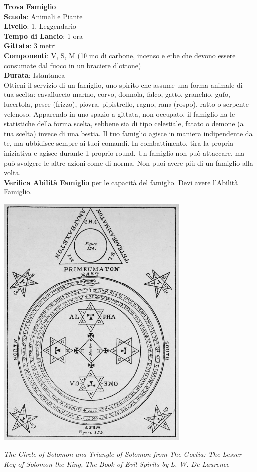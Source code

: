 \begin{multicols}{2}
\medskip\textbf{Trova Famiglio}\\
\textbf{Scuola}: Animali e Piante\\
\textbf{Livello}: 1, Leggendario\\
\textbf{Tempo di Lancio}: 1 ora\\
\textbf{Gittata}: 3 metri\\
\textbf{Componenti}: V, S, M (10 mo di carbone, incenso e erbe che devono essere consumate dal fuoco in un braciere d'ottone)\\
\textbf{Durata}: Istantanea\\
Ottieni il servizio di un famiglio, uno spirito che assume una forma animale di tua scelta: cavalluccio marino, corvo, donnola, falco, gatto, granchio, gufo, lucertola, pesce (frizzo), piovra, pipistrello, ragno, rana (rospo), ratto o serpente velenoso. Apparendo in uno spazio a gittata, non occupato, il famiglio ha le statistiche della forma scelta, sebbene sia di tipo celestiale, fatato o demone (a tua scelta) invece di una bestia. Il tuo famiglio agisce in maniera indipendente da te, ma ubbidisce sempre ai tuoi comandi. In combattimento, tira la propria iniziativa e agisce durante il proprio round. Un famiglio non può attaccare, ma può svolgere le altre azioni come di norma.
Non puoi avere più di un famiglio alla volta. \\
\textbf{Verifica Abilità Famiglio} per le capacità del famiglio. Devi avere l'Abilità Famiglio.


\end{multicols}

\vfill

\begin{center}
\includegraphics[keepaspectratio,width=0.70\textwidth]{immagini/Goetic_circle_from_The_Lesser_Key_of_Solomon.png}

\textit{The Circle of Solomon and Triangle of Solomon from The Goetia: The Lesser Key of Solomon the King, The Book of Evil Spirits by L. W. De Laurence}
\end{center}


